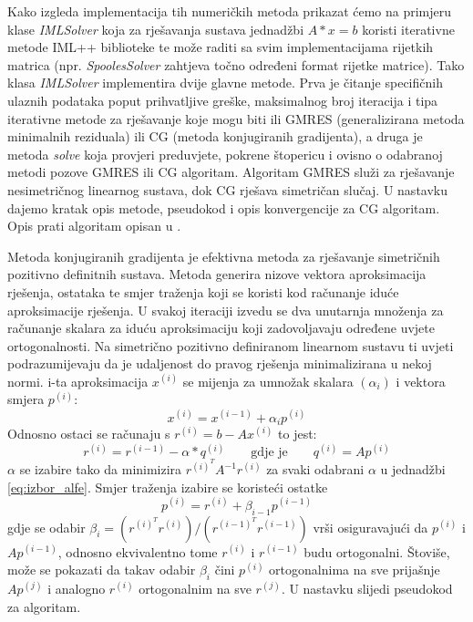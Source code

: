 \documentclass[a4paper,twoside,12pt]{memoir} %
\begin{document}
Kako izgleda implementacija tih numeričkih metoda prikazat ćemo na primjeru klase \textit{IMLSolver} koja za rješavanja sustava jednadžbi $A * x = b$ koristi iterativne metode IML++ biblioteke te može raditi sa svim implementacijama rijetkih matrica (npr. \textit{SpoolesSolver} zahtjeva točno određeni format rijetke matrice). Tako klasa \textit{IMLSolver} implementira dvije glavne metode. Prva je čitanje specifičnih ulaznih podataka poput prihvatljive greške, maksimalnog broj iteracija i tipa iterativne metode za rješavanje koje mogu biti ili GMRES (generalizirana metoda minimalnih reziduala) ili CG (metoda konjugiranih gradijenta), a druga je metoda \textit{solve} koja provjeri preduvjete, pokrene štopericu i ovisno o odabranoj metodi pozove GMRES ili CG algoritam. Algoritam GMRES služi za rješavanje nesimetričnog linearnog sustava, dok CG rješava simetričan slučaj. U nastavku dajemo kratak opis metode, pseudokod i opis konvergencije za CG algoritam. Opis prati algoritam opisan u \cite{linear_book}.  \par 
Metoda konjugiranih gradijenta je efektivna metoda za rješavanje simetričnih pozitivno definitnih sustava. Metoda generira nizove vektora aproksimacija rješenja, ostataka te smjer traženja koji se koristi kod računanje iduće aproksimacije rješenja. U svakoj iteraciji izvedu se dva unutarnja množenja za računanje skalara za iduću aproksimaciju koji zadovoljavaju određene uvjete ortogonalnosti. Na simetrično pozitivno definiranom linearnom sustavu ti uvjeti podrazumijevaju da je udaljenost do pravog rješenja minimalizirana u nekoj normi. i-ta aproksimacija $x^{(i)}$ se mijenja za umnožak skalara $(\alpha_i)$ i vektora smjera $p^(i)$:
\begin{equation}
x^{(i)} = x^{(i - 1)} + \alpha_i p^{(i)}    
\end{equation}
Odnosno ostaci se računaju s $r^{(i)} = b - Ax^{(i)}$ to jest:
\begin{equation}
\label{eq:izbor_alfe}
    r^{(i)} = r^{(i - 1)} - \alpha * q^{(i)} \qquad \text{gdje je} \qquad q^{(i)} = A p^{(i)} 
\end{equation}
$\alpha$ se izabire tako da minimizira $r^{(i)^T} A^{-1} r^{(i)}$ za svaki odabrani $\alpha$ u jednadžbi \ref{eq:izbor_alfe}. Smjer traženja izabire se koristeći ostatke
\begin{equation}
    p^{(i)} = r^{(i)} + \beta_{i-1} p^{(i-1)}
\end{equation}
gdje se odabir $\beta_i = (r^{(i)^T} r^{(i)}) / (r^{(i-1)^T} r^{(i-1)}) $ vrši osiguravajući da $p^{(i)}$ i $A p^{(i-1)}$, odnosno ekvivalentno tome $r^{(i)}$ i $r^{(i-1)}$ budu ortogonalni. Štoviše, može se pokazati da takav odabir $\beta_i$ čini $p^{(i)}$ ortogonalnima na sve prijašnje $A p^{(j)}$ i analogno $r^{(i)}$ ortogonalnim na sve $r^{(j)}$. U nastavku slijedi pseudokod za algoritam.
\end{document}
